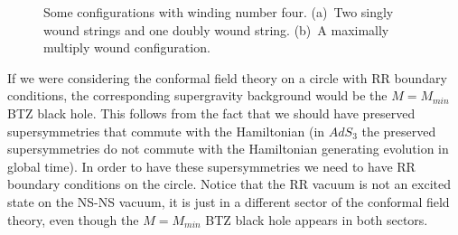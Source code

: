 \begin{figure}[htb]
\begin{center}
\epsfxsize=4.5in\leavevmode{}
\end{center}
\caption{Some configurations with winding number four.
(a)~Two singly wound strings and one doubly wound string.
(b)~A maximally multiply wound configuration.
}
\label{wind}
\end{figure} 



If we were considering the conformal field theory on a circle with
RR boundary conditions, the corresponding supergravity background 
would be the $M =M_{min}$ BTZ black hole. 
 This follows from the 
fact that we should have preserved supersymmetries that commute 
with the Hamiltonian (in $AdS_3$ the preserved supersymmetries
do not commute with the Hamiltonian generating evolution in
global time). In order to have these supersymmetries we need to
have RR boundary conditions on the circle. Notice that the RR vacuum
is not an excited state on the NS-NS vacuum, it is just in a different
sector of the conformal field theory, even though the $M= M_{min}$ 
BTZ black hole appears in both sectors. 

